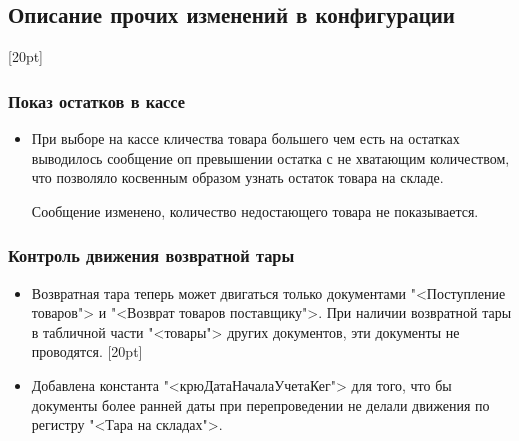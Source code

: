 \subsection{Описание прочих изменений в конфигурации}
[20pt]
\subsubsection{Показ остатков в кассе}
\begin{itemize}	
	\item При выборе на кассе кличества товара большего чем есть на остатках выводилось сообщение оп превышении остатка с не хватающим количеством, что позволяло косвенным образом узнать остаток товара на складе.\par
	Сообщение изменено, количество недостающего товара не показывается.
\end{itemize}	
\subsubsection{Контроль движения возвратной тары}	 
\begin{itemize}	
	\item Возвратная тара теперь может двигаться только документами "<Поступление товаров"> и "<Возврат товаров поставщику">. При наличии возвратной тары  в табличной части "<товары"> других документов, эти документы не проводятся.  
[20pt]	
	\item Добавлена константа "<крюДатаНачалаУчетаКег"> для того, что бы документы более ранней даты при перепроведении не делали движения по регистру "<Тара на складах">.  
\end{itemize}			



